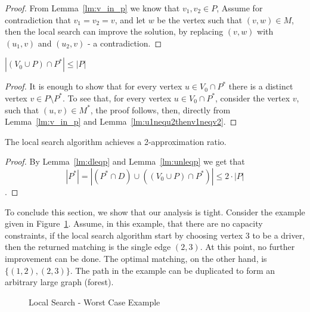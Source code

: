 \begin{proof}
From Lemma~\ref{lm:v_in_p} we know that $v_1, v_2 \in P$,
Assume for contradiction that $v_1 = v_2 = v$,
and let $w$ be the vertex such that $(v, w) \in M$,
then the local search can improve the solution, 
by replacing $(v, w)$ with $(u_1, v)$ and $(u_2, v)$ - a contradiction.
\end{proof}

\begin{lemma}
\label{lm:unleqp}
$|(V_0 \cup P) \cap P^*| \leq |P|$
\end{lemma}

\begin{proof}
It is enough to show that for every vertex $u \in V_0 \cap P^*$
there is a distinct vertex $v \in P \setminus P^*$.
To see that, for every vertex $u \in V_0 \cap P^*$, 
consider the vertex $v$, such that $(u, v) \in M^*$, 
the proof follows, then, directly
from Lemma~\ref{lm:v_in_p} and Lemma~\ref{lm:u1nequ2thenv1neqv2}.  
\end{proof}


\begin{theorem}
The local search algorithm achieves a 2-approximation ratio.
\end{theorem}

\begin{proof}
By Lemma~\ref{lm:dleqp} and Lemma~\ref{lm:unleqp} we get that 
$$
|P^*| = 
|(P^* \cap D) \cup ((V_0 \cup P) \cap P^*)| \leq 2 \cdot |P|
$$.
\end{proof}

To conclude this section, we show that our analysis is tight.
Consider the example given in Figure~\ref{fig:localtight}.
Assume, in this example, that there are no capacity constraints,
if the local search algorithm start by choosing vertex $3$ to be a driver, 
then the returned matching is the single edge $(2,3)$.
At this point, no further improvement can be done.
The optimal matching, on the other hand, is $\{(1, 2), (2, 3)\}$. 
The path in the example can be duplicated to form an arbitrary large graph (forest).

\begin{figure} 

\caption{
\label{fig:localtight}
Local Search - Worst Case Example
}
\end{figure}